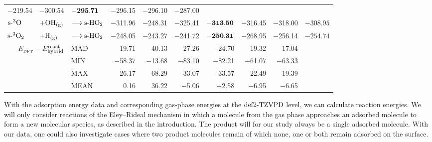 \begin{table}[t!]
\begin{adjustbox}{width=1.0\textwidth,center}
\begin{tabular}{lll|rrrrrr|r}
    $-$219.54 & $-$300.54 & $\mathbf{-295.71}$ & $-$296.15 & $-$296.10 & $-287.00$
    \\
    $\text{s-}^3\text{O}$&$+\text O \text H_\text{(g)}$&$\longrightarrow\text{s-}\text H \text O_2$ & $-$311.96 &
    $-$248.31 & $-$325.41 & $\mathbf{-313.50}$ & $-$316.45 & $-$318.00 & $-308.95$
    \\
    $\text{s-}^3\text O_2$&$+\text{H}_\text{(g)}$&$\longrightarrow\text{s-}\text H \text O_2$ & $-$248.05 &
    $-$243.27 & $-$241.72 & $\mathbf{-250.31}$ & $-$268.95 & $-$256.14 & $-254.74$
    \\[2pt]
    
    \hline \hline
\multicolumn{2}{r|}{\multirow{4}{*}{$E_{_{\text{DFT}}} - E^{\text{react}}_{\text{hybrid}}$}} &
                            MAD   & 19.71 & 40.13 & 27.26 & 24.70 & 19.32 & 17.04 &  \\
    \multicolumn{2}{r|}{} &  MIN   & $-$58.37 & $-$13.68 & $-$83.10 & $-$82.21 & $-$61.07 & $-$63.33 &  \\
    \multicolumn{2}{r|}{} &  MAX   & 26.17 & 68.29 & 33.07 & 33.57 & 22.49 & 19.39 &  \\
    \multicolumn{2}{r|}{} &  MEAN  & 0.16  & 36.22 & $-$5.06 & $-$2.58 & $-$6.95 & $-$6.65 &  \\[5pt]
%
%
    \end{tabular}%
  \label{Tab:Ads:React}%
    \end{adjustbox}
\end{table}%


With the adsorption energy data and corresponding gas-phase energies at the
$\text{def2-TZVPD}$ level, we can calculate reaction energies. We will only
consider reactions of the Eley--Rideal mechanism in which a molecule
from the gas phase approaches an adsorbed molecule to form
a new molecular species, as described in the introduction.
The product will for our study always be a single adsorbed molecule. With our data,
one could also investigate cases where two product molecules remain
of which none, one or both remain adsorbed on the surface.

